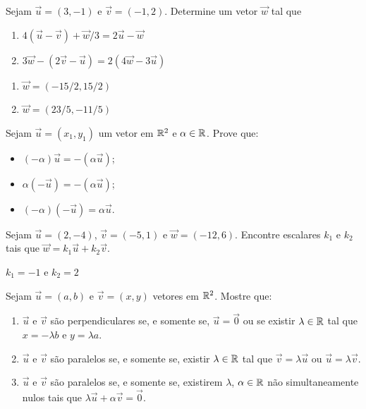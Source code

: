 \documentclass[12pt]{exam}
\begin{document}
\vspace{.3cm}

\questao{} Sejam $\vec{u} = (3, -1)$ e $\vec{v} = (-1, 2)$. Determine um vetor $\vec{w}$ tal que
\begin{enumerate}[label=({\alph*})]
    \item $4(\vec{u} - \vec{v}) + \vec{w}/3 = 2\vec{u} - \vec{w}$
    \item $3\vec{w} - (2\vec{v} - \vec{u}) = 2(4\vec{w} - 3\vec{u})$
\end{enumerate}
\begin{solucao}
    \begin{enumerate}[label=({\alph*})]
        \item $\vec{w} = (-15/2, 15/2)$
        \item $\vec{w} = (23/5, -11/5)$
    \end{enumerate}
\end{solucao}

\vspace{.3cm}

\questao Sejam $\vec{u} = (x_1, y_1)$ um vetor em $\mathbb{R}^2$ e $\alpha \in \mathbb{R}$. Prove que:
\begin{itemize}
    \item[(S1)] $(-\alpha)\vec{u} = -(\alpha\vec{u})$;
    \item[(S2)] $\alpha(-\vec{u}) = -(\alpha\vec{u})$;
    \item[(S3)] $(-\alpha)(-\vec{u}) = \alpha\vec{u}$.
\end{itemize}

\vspace{.3cm}

\questao{} Sejam $\vec{u} = (2, -4)$, $\vec{v} = (-5, 1)$ e $\vec{w} = (-12, 6)$. Encontre escalares $k_1$ e $k_2$ tais que $\vec{w} = k_1\vec{u} + k_2\vec{v}$.
\begin{solucao}
    $k_1 = -1$ e $k_2 = 2$
\end{solucao}

\vspace{.3cm}

\questao{} Sejam $\vec{u} = (a, b)$ e $\vec{v} = (x, y)$ vetores em $\mathbb{R}^2$. Mostre que:
\begin{enumerate}[label=({\alph*})]
    \item $\vec{u}$ e $\vec{v}$ são perpendiculares se, e somente se, $\vec{u} = \vec{0}$ ou se existir $\lambda \in \mathbb{R}$ tal que $x = -\lambda b$ e $y = \lambda a$.

    \item $\vec{u}$ e $\vec{v}$ são paralelos se, e somente se, existir $\lambda \in \mathbb{R}$ tal que $\vec{v} = \lambda\vec{u}$ ou $\vec{u} = \lambda\vec{v}$.

    \item $\vec{u}$ e $\vec{v}$ são paralelos se, e somente se, existirem $\lambda$, $\alpha \in \mathbb{R}$ não simultaneamente nulos tais que $\lambda\vec{u} + \alpha\vec{v} = \vec{0}$.
\end{enumerate}
\end{document}
